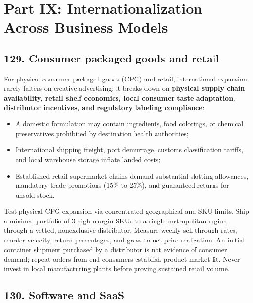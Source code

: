 \section{Part IX: Internationalization Across Business Models}

\subsection{129. Consumer packaged goods and retail}

For physical consumer packaged goods (CPG) and retail, international expansion rarely falters on creative advertising; it breaks down on \textbf{physical supply chain availability, retail shelf economics, local consumer taste adaptation, distributor incentives, and regulatory labeling compliance}:
\begin{itemize}
    \item A domestic formulation may contain ingredients, food colorings, or chemical preservatives prohibited by destination health authorities;
    \item International shipping freight, port demurrage, customs classification tariffs, and local warehouse storage inflate landed costs;
    \item Established retail supermarket chains demand substantial slotting allowances, mandatory trade promotions (15\% to 25\%), and guaranteed returns for unsold stock.
\end{itemize}

Test physical CPG expansion via concentrated geographical and SKU limits. Ship a minimal portfolio of 3 high-margin SKUs to a single metropolitan region through a vetted, nonexclusive distributor. Measure weekly sell-through rates, reorder velocity, return percentages, and gross-to-net price realization. An initial container shipment purchased by a distributor is not evidence of consumer demand; repeat orders from end consumers establish product-market fit. Never invest in local manufacturing plants before proving sustained retail volume.

\subsection{130. Software and SaaS}

